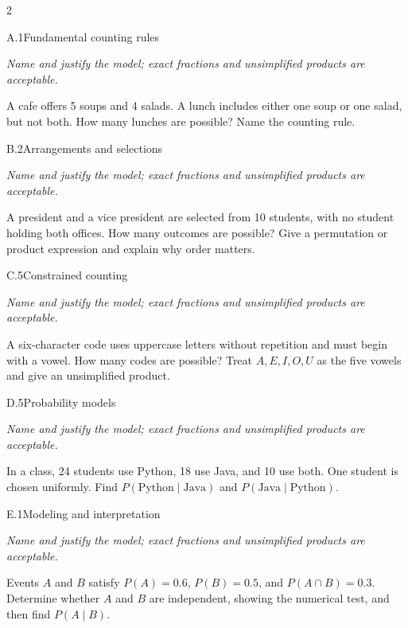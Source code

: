 \documentclass[9pt]{extarticle}
\begin{document}
\begin{multicols}{2}
\begin{CoreProblem}{A.1}{Fundamental counting rules}
{\scriptsize\textit{Name and justify the model; exact fractions and unsimplified products are acceptable.}\par}
A cafe offers 5 soups and 4 salads. A lunch includes either one soup
    or one salad, but not both. How many lunches are possible? Name the counting
    rule.
\end{CoreProblem}
\begin{CoreProblem}{B.2}{Arrangements and selections}
{\scriptsize\textit{Name and justify the model; exact fractions and unsimplified products are acceptable.}\par}
A president and a vice president are selected from 10 students, with
    no student holding both offices. How many outcomes are possible? Give a
    permutation or product expression and explain why order matters.
\end{CoreProblem}
\begin{CoreProblem}{C.5}{Constrained counting}
{\scriptsize\textit{Name and justify the model; exact fractions and unsimplified products are acceptable.}\par}
A six-character code uses uppercase letters without repetition and
    must begin with a vowel. How many codes are possible? Treat
    $A,E,I,O,U$ as the five vowels and give an unsimplified product.
\end{CoreProblem}
\columnbreak
\begin{CoreProblem}{D.5}{Probability models}
{\scriptsize\textit{Name and justify the model; exact fractions and unsimplified products are acceptable.}\par}
In a class, 24 students use Python, 18 use Java, and 10 use both.
    One student is chosen uniformly. Find
    $P(\text{Python}\mid\text{Java})$ and
    $P(\text{Java}\mid\text{Python})$.
\end{CoreProblem}
\begin{CoreProblem}{E.1}{Modeling and interpretation}
{\scriptsize\textit{Name and justify the model; exact fractions and unsimplified products are acceptable.}\par}
Events $A$ and $B$ satisfy $P(A)=0.6$, $P(B)=0.5$, and
    $P(A\cap B)=0.3$. Determine whether $A$ and $B$ are independent, showing
    the numerical test, and then find $P(A\mid B)$.
\end{CoreProblem}
\end{multicols}
\CoreWorkArea
\FormBreak
\end{document}
